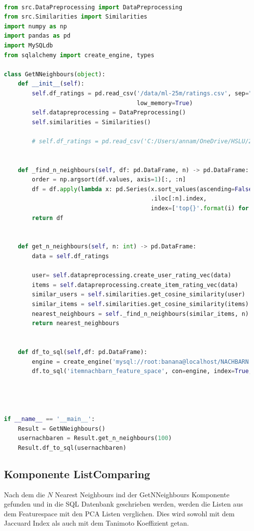 \begin{lstlisting}[language=Python, caption= Komponente GetNNeighbours, label=lst:GetNNeighbours]

from src.DataPreprocessing import DataPreprocessing
from src.Similarities import Similarities
import numpy as np
import pandas as pd
import MySQLdb
from sqlalchemy import create_engine, types

class GetNNeighbours(object):
    def __init__(self):
        self.df_ratings = pd.read_csv('/data/ml-25m/ratings.csv', sep=",", usecols=[0, 1, 2], memory_map=True,
                                      low_memory=True)
        self.datapreprocessing = DataPreprocessing()
        self.similarities = Similarities()

        # self.df_ratings = pd.read_csv('C:/Users/annam/OneDrive/HSLU/20FS/BA/Data/ml-latest-small/ratings.csv', sep=",", memory_map=True, low_memory=True)


    def _find_n_neighbours(self, df: pd.DataFrame, n) -> pd.DataFrame:
        order = np.argsort(df.values, axis=1)[:, :n]
        df = df.apply(lambda x: pd.Series(x.sort_values(ascending=False)
                                          .iloc[:n].index,
                                          index=['top{}'.format(i) for i in range(1, n + 1)]), axis=1)
        return df


    def get_n_neighbours(self, n: int) -> pd.DataFrame:
        data = self.df_ratings

        user= self.datapreprocessing.create_user_rating_vec(data)
        items = self.datapreprocessing.create_item_rating_vec(data)
        similar_users = self.similarities.get_cosine_similarity(user)
        similar_items = self.similarities.get_cosine_similarity(items)
        nearest_neighbours = self._find_n_neighbours(similar_items, n)
        return nearest_neighbours


    def df_to_sql(self,df: pd.DataFrame):
        engine = create_engine('mysql://root:banana@localhost/NACHBARN')  # enter your password and database names here
        df.to_sql('itemnachbarn_feature_space', con=engine, index=True, index_label='movieId', if_exists='replace')




if __name__ == '__main__':
    Result = GetNNeighbours()
    usernachbaren = Result.get_n_neighbours(100)
    Result.df_to_sql(usernachbaren)

\end{lstlisting}
\subsection{Komponente ListComparing}
Nach dem die $N$ Nearest Neighbours ind der GetNNeighbours Komponente gefunden und in die SQL Datenbank geschrieben werden, werden die Listen aus dem Featurespace mit den PCA Listen verglichen.
Dies wird sowohl mit dem Jaccuard Index als auch mit dem Tanimoto Koeffizient getan.


